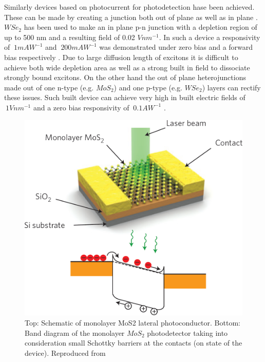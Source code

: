 Similarly devices based on photocurrent for photodetection hase been achieved. These can be made by creating a junction both out of plane \cite{Withers2015}\cite{Cheng2014} as well as in plane \cite{Ross2014}\cite{Fontana2013}. $WSe_2$ has been used to make an in plane p-n junction with a depletion region of up to 500 nm and a resulting field of 0.02 $V nm^{-1}$.  In such a device a responsivity of $~1 mAW^{-1}$ and $~200 mAW^{-1}$ was demonstrated under zero bias and a forward bias respectively \cite{Baugher2014}. Due to large diffusion length of excitons it is difficult to achieve both wide depletion area as well as a strong built in field to dissociate strongly bound excitons. On the other hand the out of plane heterojunctions made out of one n-type (e.g. $MoS_2$) and one p-type (e.g. $WSe_2$) layers can rectify these issues. Such built device can achieve very high in built electric fields of $~1 V nm^{-1}$ and a zero bias responsivity of $~0.1 A W^{-1}$ \cite{Cheng2014}\cite{Lee2014}. 

\begin{figure}[!h]
	\begin{center}
		\includegraphics[scale=0.35]{PhotodetectorDiagram.png}
		\caption{Top: Schematic of monolayer MoS2 lateral photoconductor. Bottom: Band diagram of
the monolayer $MoS_2$ photodetector taking into consideration small Schottky barriers at the contacts (on state of the device). Reproduced from \cite{Mak2016}}
		\label{fig:PhotodetectorDiagram}
	\end{center}
\end{figure}

